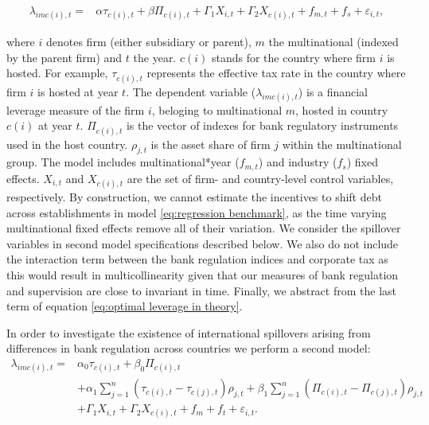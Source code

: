 \documentclass[12pt]{article}
\begin{document}
	\begin{equation}
	\begin{aligned}
	\lambda_{imc(i),t}=&\alpha\tau_{c(i),t}+\beta\Pi_{c(i),t}+\Gamma_1 X_{i,t}+\Gamma_2 X_{c(i),t}+f_{m,t}+f_{s}+\varepsilon_{i,t},
	\label{eq:regression benchmark}
	\end{aligned}
	\end{equation}
	
		where $i$ denotes firm (either subsidiary or parent), $m$ the multinational (indexed by the parent firm) and $t$ the year. $c(i)$ stands for the country where firm $i$ is hosted. For example, $\tau_{c(i),t}$ represents the effective tax rate in the country where firm $i$ is hosted at year $t$. The dependent variable ($\lambda_{imc(i),t}$) is a financial leverage measure of the firm $i$, beloging to multinational $m$, hosted in country $c(i)$ at year $t$. $\Pi_{c(i),t}$ is the vector of indexes for bank regulatory instruments used in the host country. $\rho_{j,t}$ is the asset share of firm $j$ within the multinational group. The model includes multinational*year ($f_{m,t}$) and industry ($f_s$) fixed effects. $X_{i,t}$ and $X_{c(i),t}$ are the set of firm- and country-level control variables, respectively. By construction, we cannot estimate the incentives to shift debt across establishments in model \ref{eq:regression benchmark}, as the time varying multinational fixed effects remove all of their variation. We consider the spillover variables in second model specifications described below. We also do not include the interaction term between the bank regulation indices and corporate tax as this would result in multicollinearity given that our measures of bank regulation and supervision are close to invariant in time. Finally, we abstract from the last term of equation \ref{eq:optimal leverage in theory}.	
	
In order to investigate the existence of international spillovers arising from differences in bank regulation across countries we perform a second model: 
	\begin{equation}
	\begin{aligned}
	\lambda_{imc(i),t}=&\alpha_0\tau_{c(i),t}+\beta_0\Pi_{c(i),t}\\
	&+\alpha_1\sum_{j=1}^{n}(\tau_{c(i),t}-\tau_{c(j),t})\rho_{j,t}+\beta_1\sum_{j=1}^{n}(\Pi_{c(i),t}-\Pi_{c(j),t})\rho_{j,t}\\
	&+\Gamma_1 X_{i,t}+\Gamma_2 X_{c(i),t}+f_{m}+f_{t}+\varepsilon_{i,t}.
	\label{eq:regression spillover}
	\end{aligned}
	\end{equation}
	
\end{document}
